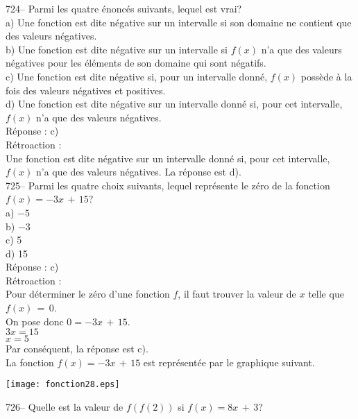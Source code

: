 ﻿\documentclass[letterpaper, 12pt]{article}
\begin{document}
724-- Parmi les quatre \'enonc\'es suivants, lequel est vrai?\\
a) Une fonction est dite n\'egative sur un intervalle si son domaine ne
contient que des valeurs n\'egatives.\\
b) Une fonction est dite n\'egative sur un intervalle si $f(x)$ n'a que des
valeurs n\'egatives pour les \'el\'ements de son domaine qui sont
n\'egatifs.\\
c) Une fonction est dite n\'egative si, pour un intervalle donn\'e, $f(x)$
poss\`ede \`a la fois des valeurs n\'egatives et positives.  \\
d) Une fonction est dite n\'egative sur un intervalle donn\'e si, pour cet
intervalle, $f(x)$ n'a que des valeurs n\'egatives.  \\

R\'eponse : c)\\

R\'etroaction : \\
Une fonction est dite n\'egative sur un intervalle donn\'e si, pour cet
intervalle, $f(x)$ n'a que des valeurs n\'egatives.  La r\'eponse est d).\\

725-- Parmi les quatre choix suivants, lequel repr\'esente le z\'ero de la
fonction $f(x)=-3x\,+\,15$?\\
a) $-5$\\
b) $-3$\\
c) 5\\
d) 15\\

R\'eponse : c)\\

R\'etroaction : \\
Pour d\'eterminer le z\'ero d'une fonction $f$, il faut trouver la valeur de
$x$ telle que $f(x)\,=\,0$.\\
On pose donc $0=-3x\,+\,15$.\\
$3x=15$\\
$x=5$\\
Par cons\'equent, la r\'eponse est c).\\
La fonction $f(x)=-3x\,+\,15$ est repr\'esent\'ee par le graphique
suivant.\\
    \begin{center}
    \texttt{[image: fonction28.eps]}
    \end{center}

726-- Quelle est la valeur de $f(f(2))$ si $f(x)=8x\,+\,3$?\\
\end{document}
